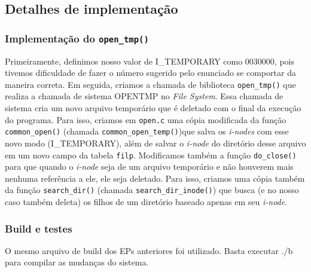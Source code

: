 \documentclass[]{article}
\begin{document}
\hypertarget{detalhes-de-implementauxe7uxe3o}{%
\subsection{Detalhes de
implementação}\label{detalhes-de-implementauxe7uxe3o}}

\hypertarget{implementauxe7uxe3o-do-open_tmp}{%
\subsubsection{\texorpdfstring{Implementação do
\texttt{open\_tmp()}}{Implementação do open\_tmp()}}\label{implementauxe7uxe3o-do-open_tmp}}

Primeiramente, definimos nosso valor de I\_TEMPORARY como 0030000, pois
tivemos dificuldade de fazer o número sugerido pelo enunciado se
comportar da maneira correta. Em seguida, criamos a chamada de
biblioteca \texttt{open\_tmp()} que realiza a chamada de sistema OPENTMP
no \emph{File System}. Essa chamada de sistema cria um novo arquivo
temporário que é deletado com o final da execução do programa. Para
isso, criamos em \texttt{open.c} uma cópia modificada da função
\texttt{common\_open()} (chamada \texttt{common\_open\_temp()})que salva
os \emph{i-nodes} com esse novo modo (I\_TEMPORARY), além de salvar o
\emph{i-node} do diretório desse arquivo em um novo campo da tabela
\texttt{filp}. Modificamos também a função \texttt{do\_close()} para que
quando o \emph{i-node} seja de um arquivo temporário e não houverem mais
nenhuma referência a ele, ele seja deletado. Para isso, criamos uma
cópia também da função \texttt{search\_dir()} (chamada
\texttt{search\_dir\_inode()}) que busca (e no nosso caso também deleta)
os filhos de um diretório baseado apenas em seu \emph{i-node}.

\hypertarget{build-e-testes}{%
\subsubsection{Build e testes}\label{build-e-testes}}

O mesmo arquivo de build dos EPs anteriores foi utilizado. Basta
executar ./b para compilar as mudanças do sistema.
\end{document}
